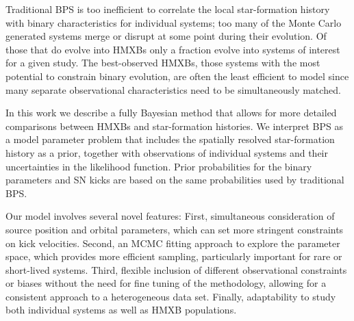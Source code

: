 \documentclass[usenatbib]{mnras}
\begin{document}
Traditional BPS is too inefficient to correlate the local star-formation history with binary characteristics for individual systems; too many of the Monte Carlo generated systems merge or disrupt at some point during their evolution. Of those that do evolve into HMXBs only a fraction evolve into systems of interest for a given study. The best-observed HMXBs, those systems with the most potential to constrain binary evolution, are often the least efficient to model since many separate observational characteristics need to be simultaneously matched.


In this work we describe a fully Bayesian method that allows for more detailed comparisons between HMXBs and star-formation histories. We interpret BPS as a model parameter problem that includes the spatially resolved star-formation history as a prior, together with observations of individual systems and their uncertainties in the likelihood function. Prior probabilities for the binary parameters and SN kicks are based on the same probabilities used by traditional BPS.


Our model involves several novel features: First, simultaneous consideration of source position and orbital parameters, which can set more stringent constraints on kick velocities. Second, an MCMC fitting approach to explore the parameter space, which provides more efficient sampling, particularly important for rare or short-lived systems. Third, flexible inclusion of different observational constraints or biases without the need for fine tuning of the methodology, allowing for a consistent approach to a heterogeneous data set. Finally, adaptability to study both individual systems as well as HMXB populations.
\end{document}
